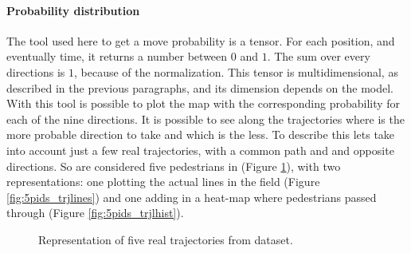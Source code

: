 \documentclass[class=article, crop=false]{standalone}
\begin{document}


\FloatBarrier
\paragraph{Probability distribution}
The tool used here to get a move probability is a tensor.
For each position, and eventually time, it returns a number between $0$ and $1$.
The sum over every directions is $1$, because of the normalization.
This tensor is multidimensional, as described in the previous paragraphs, and its dimension depends on the model.
With this tool is possible to plot the map with the corresponding probability for each of the nine directions.
It is possible to see along the trajectories where is the more probable direction to take and which is the less.
To describe this lets take into account just a few real trajectories, with a common path and and opposite directions.
So are considered five pedestrians in (Figure \ref{fig:5pids_trjl}), with two representations:
one plotting the actual lines in the field (Figure \ref{fig:5pids_trjlines}) and one adding in a heat-map where pedestrians passed through (Figure \ref{fig:5pids_trjlhist}).
\begin{figure}[h]
    \centering
    \quad
    \captionsetup{width=.8\linewidth}
    \caption{Representation of five real trajectories from dataset.}
    \label{fig:5pids_trjl}
\end{figure}
\end{document}
